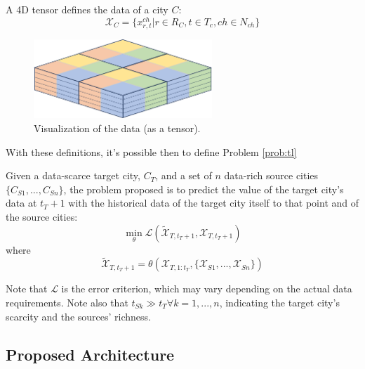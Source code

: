 \begin{definition} \label{def:dim}
A 4D tensor defines the data of a city $C$:
	\begin{equation}\label{eq:defdim}
		\mathcal{X}_C = \{x_{r, t}^{ch} | r \in R_C, t \in T_c, ch \in N_{ch}\}
	\end{equation}
\end{definition}

\begin{figure}[!ht]
\noindent\hspace{0.5mm}\includegraphics[width=0.6\textwidth]{./figures/data_tensor.pdf}
\caption{Visualization of the data (as a tensor).}
\label{fig:data_tensor}
\end{figure}

With these definitions, it's possible then to define Problem \ref{prob:tl}

\begin{problem} \label{prob:tl}
Given a data-scarce target city, $C_T$, and a set of $n$ data-rich source cities $\{C_{S1}, ..., C_{Sn}\}$, the problem proposed is to predict the value of the target city's data at $t_T+1$ with the historical data of the target city itself to that point and of the source cities:
	\begin{equation}\label{eq:probtl}
		\min_{\theta}\mathcal{L}(\tilde{\mathcal{X}}_{T, t_T + 1}, \mathcal{X}_{T, t_T + 1} )
	\end{equation}
	where
	\begin{equation}\label{eq:probtl2}
		\tilde{\mathcal{X}}_{T, t_T + 1} =  \theta(\mathcal{X}_{T, 1:t_T}, \{\mathcal{X}_{S1}, ..., \mathcal{X}_{Sn}\})
	\end{equation}
\end{problem}

Note that $ \mathcal{L}$ is the error criterion, which may vary depending on the actual data requirements. Note also that $t_{Sk} \gg t_T \forall k=1, ..., n$, indicating the target city's scarcity and the sources' richness.

\subsection{Proposed Architecture}

